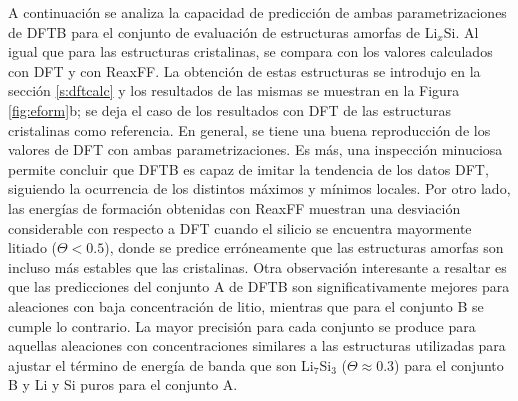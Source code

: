 A continuación se analiza la capacidad de predicción de ambas parametrizaciones
de DFTB para el conjunto de evaluación de estructuras amorfas de Li$_x$Si. Al
igual que para las estructuras cristalinas, se compara con los valores
calculados con DFT y con ReaxFF. La obtención de estas estructuras se introdujo
en la sección \ref{s:dftcalc} y los resultados de las mismas se muestran
en la Figura \ref{fig:eform}b; se deja el caso de los resultados con DFT de
las estructuras cristalinas como referencia. En general, se tiene una buena
reproducción de los valores de DFT con ambas parametrizaciones. Es más, una
inspección minuciosa permite concluir que DFTB es capaz de imitar la tendencia
de los datos DFT, siguiendo la ocurrencia de los distintos máximos y mínimos
locales. Por otro lado, las energías de formación obtenidas con ReaxFF muestran
una desviación considerable con respecto a DFT cuando el silicio se encuentra
mayormente litiado ($\Theta < 0.5$), donde se predice erróneamente que las
estructuras amorfas son incluso más estables que las cristalinas. Otra
observación interesante a resaltar es que las predicciones del conjunto A de
DFTB son significativamente mejores para aleaciones con baja concentración de
litio, mientras que para el conjunto B se cumple lo contrario. La mayor
precisión para cada conjunto se produce para aquellas aleaciones con
concentraciones similares a las estructuras utilizadas para ajustar el término
de energía de banda que son Li$_7$Si$_3$ ($\Theta \approx 0.3$) para el conjunto
B y Li y Si puros para el conjunto A.
